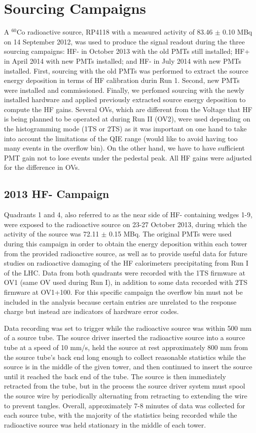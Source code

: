 \section{Sourcing Campaigns}
A $^{60}$Co radioactive source, RP4118 with a measured activity of 83.46 $\pm$
0.10 MBq on 14 September 2012, was used to produce the signal readout
during the three sourcing campaigns: HF- in October 2013 with the old PMTs still
installed; HF+ in April 2014 with new PMTs installed; and HF- in July 2014 with
new PMTs installed. First, sourcing with the old PMTs was performed to extract
the source energy deposition in terms of HF calibration durin Run 1. Second, new PMTs were installed and commissioned. Finally, we perfomed sourcing with the newly installed hardware and applied previously extracted source energy deposition to compute the HF gains. Several OVs, which are different from the Voltage that HF is being planned to be operated at during Run II (OV2), were used depending on the histogramming mode (1TS or 2TS) as it was important on one hand to take into account the limitations of the QIE range (would like to avoid having too many events in the overflow bin). On the other hand, we have to have sufficient PMT gain not to lose events under the pedestal peak. All HF gains were adjusted for the difference in OVs.

\subsection{2013 HF- Campaign}
Quadrants 1 and 4, also referred to as the near side of HF- containing wedges
1-9, were exposed to the radioactive source on 23-27 October 2013, during
which the activity of the source was 72.11 $\pm$ 0.15 MBq. The original
PMTs were used during this campaign in order to obtain the energy deposition
within each tower from the provided radioactive source, as well as to provide
useful data for future studies on radioactive damaging of the HF calorimeters
precipitating from Run I of the LHC. Data from both quadrants were recorded
with the 1TS firmware at OV1 (same OV used during Run I), in
addition to some data recorded with 2TS firmware at OV1+100. For this
specific campaign the overflow bin must not be included in the analysis
because certain entries are unrelated to the response charge but instead are
indicators of hardware error codes.

Data recording was set to trigger while the radioactive source was within 500 mm
of a source tube. The source driver inserted the radioactive source into a source
tube at a speed of 10 mm/s, held the source at rest approximately 800 mm
from the source tube's back end long enough to collect reasonable statistics
while the source is in the middle of the given tower, and then continued to
insert the source until it reached the back end of the tube. The source is then
immediately retracted from the tube, but in the process the source driver system
must spool the source wire by periodically alternating from retracting to extending the wire to prevent tangles. Overall, approximately 7-8 minutes of data was collected for each source tube, with the majority of the statistics being recorded while the radioactive source was held stationary in the middle of each tower.

